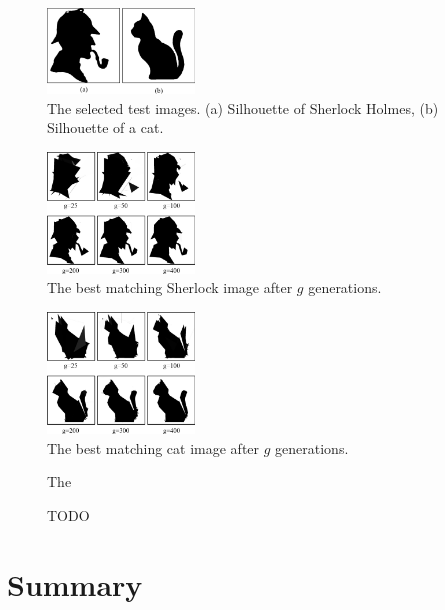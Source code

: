 \documentclass[conference]{IEEEtran}
\begin{document}
\begin{figure}[htbp]
	\centering
	\includegraphics[width=0.35\textwidth]{fig/originals.png}
	\caption{The selected test images. (a) Silhouette of Sherlock Holmes, (b) Silhouette of a cat.}
	\label{fig-orig}
\end{figure}

\begin{figure}[htbp]
	\centering
	\includegraphics[width=0.35\textwidth]{fig/sherlock6.png}
	\caption{The best matching Sherlock image after $g$ generations.}
	\label{sherlock-6}
\end{figure}

\begin{figure}[htbp]
	\centering
	\includegraphics[width=0.35\textwidth]{fig/cat6.png}
	\caption{The best matching cat image after $g$ generations.}
	\label{cat-6}
\end{figure}


\begin{figure}[htbp]
	\centering
		\resizebox{.45\textwidth}{!}{}
	\caption{The } %
	\label{foo}
\end{figure}

\begin{figure}[htbp]
	\centering
		\resizebox{.45\textwidth}{!}{}
	\caption{TODO}
	\label{foo}
\end{figure}


\section{Summary}
\end{document}

